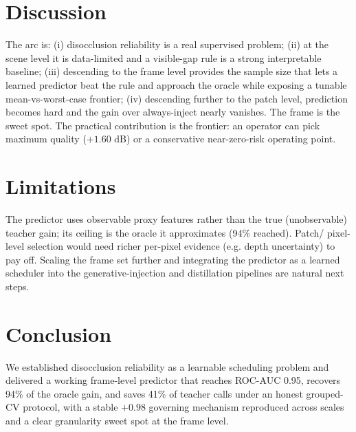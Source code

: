 \documentclass[10pt,twocolumn,letterpaper]{article}
\begin{document}
\section{Discussion}
\label{sec:disc}
The arc is: (i) disocclusion reliability is a real supervised problem; (ii) at
the scene level it is data-limited and a visible-gap rule is a strong
interpretable baseline; (iii) descending to the frame level provides the sample
size that lets a learned predictor beat the rule and approach the oracle while
exposing a tunable mean-vs-worst-case frontier; (iv) descending further to the
patch level, prediction becomes hard and the gain over always-inject nearly
vanishes. The frame is the sweet spot. The practical contribution is the
frontier: an operator can pick maximum quality ($+1.60$ dB) or a conservative
near-zero-risk operating point.

\section{Limitations}
\label{sec:limits}
The predictor uses observable proxy features rather than the true (unobservable)
teacher gain; its ceiling is the oracle it approximates (94\% reached). Patch/
pixel-level selection would need richer per-pixel evidence (e.g. depth
uncertainty) to pay off. Scaling the frame set further and integrating the
predictor as a learned scheduler into the generative-injection and distillation
pipelines are natural next steps.

\section{Conclusion}
\label{sec:concl}
We established disocclusion reliability as a learnable scheduling problem and
delivered a working frame-level predictor that reaches ROC-AUC 0.95, recovers
94\% of the oracle gain, and saves 41\% of teacher calls under an honest
grouped-CV protocol, with a stable $+0.98$ governing mechanism reproduced across
scales and a clear granularity sweet spot at the frame level.

{\small


}
\end{document}
